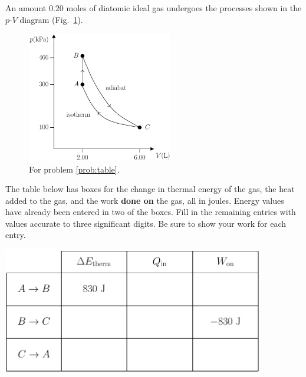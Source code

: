 \begin{problem}
An amount $0.20$ moles of diatomic ideal gas undergoes the 
processes shown in the $p$-$V$ diagram (Fig.~\ref{fig:pv_processes}).
\begin{figure}
\begin{center}
\includegraphics[width=2.5in]{gas_processes/pv_processes.pdf}
\caption{For problem \ref{prob:table}.}
\label{fig:pv_processes}
\end{center}
\end{figure}
\medskip
The table below has boxes for the change in thermal energy of the
gas, the heat added to the gas, and the work \textbf{done on} the gas,
all in joules. 
\smallskip
Energy values have already been entered in two of the
boxes. Fill in the remaining entries with values accurate to three
significant digits.  Be sure to show your work for each entry.

\begin{center}
\hspace{-1in}\includegraphics[width=4.5in]{gas_processes/table}
\end{center}
\label{prob:table}
\end{problem}

